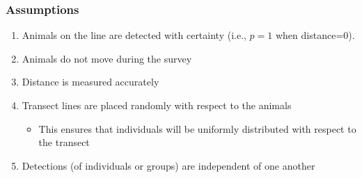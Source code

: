 \documentclass[color=usenames,dvipsnames]{beamer}\usepackage[]{graphicx}\usepackage[]{color}
\begin{document}












\begin{frame}
  \frametitle{Assumptions}
  \large
  \begin{enumerate}[<+- | visible@+->][\bf (1)]%
    \item Animals on the line are detected with certainty (i.e., $p=1$ when distance=0).
    \item Animals do not move during the survey
    \item Distance is measured accurately
    \item Transect lines are placed randomly with respect to the animals
      \begin{itemize}
        \large
        \item This ensures that individuals will be uniformly
          distributed with respect to the transect
      \end{itemize}
    \item Detections (of individuals or groups) are independent of one another
  \end{enumerate}
\end{frame}
\end{document}
